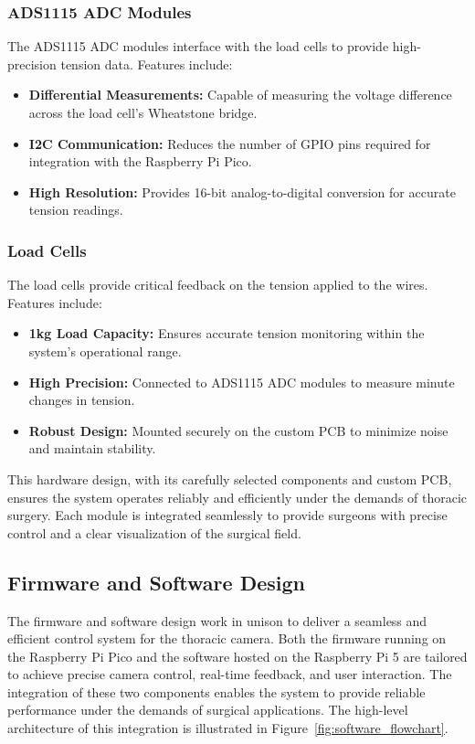 \subsubsection{ADS1115 ADC Modules}
The ADS1115 ADC modules interface with the load cells to provide high-precision tension data. Features include:
\begin{itemize}
    \item \textbf{Differential Measurements:} Capable of measuring the voltage difference across the load cell's Wheatstone bridge.
    \item \textbf{I2C Communication:} Reduces the number of GPIO pins required for integration with the Raspberry Pi Pico.
    \item \textbf{High Resolution:} Provides 16-bit analog-to-digital conversion for accurate tension readings.
\end{itemize}

\subsubsection{Load Cells}
The load cells provide critical feedback on the tension applied to the wires. Features include:
\begin{itemize}
    \item \textbf{1kg Load Capacity:} Ensures accurate tension monitoring within the system's operational range.
    \item \textbf{High Precision:} Connected to ADS1115 ADC modules to measure minute changes in tension.
    \item \textbf{Robust Design:} Mounted securely on the custom PCB to minimize noise and maintain stability.
\end{itemize}


This hardware design, with its carefully selected components and custom PCB, ensures the system operates reliably and efficiently under the demands of thoracic surgery. Each module is integrated seamlessly to provide surgeons with precise control and a clear visualization of the surgical field.

\subsection{Firmware and Software Design}

The firmware and software design work in unison to deliver a seamless and efficient control system for the thoracic camera. Both the firmware running on the Raspberry Pi Pico and the software hosted on the Raspberry Pi 5 are tailored to achieve precise camera control, real-time feedback, and user interaction. The integration of these two components enables the system to provide reliable performance under the demands of surgical applications. The high-level architecture of this integration is illustrated in Figure~\ref{fig:software_flowchart}.

